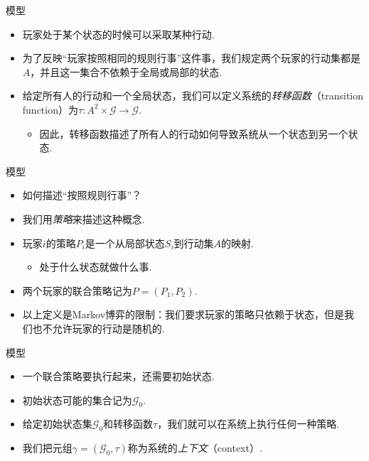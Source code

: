\begin{frame}{模型}
\begin{itemize}
    \item 玩家处于某个状态的时候可以采取某种行动.
    \item 为了反映“玩家按照相同的规则行事”这件事，我们规定两个玩家的行动集都是$A$，并且这一集合不依赖于全局或局部的状态.
    \item 给定所有人的行动和一个全局状态，我们可以定义系统的\emph{转移函数}（transition function）为$\tau:A^2\times\mathcal G\to\mathcal G$.
    \begin{itemize}
        \item 因此，转移函数描述了所有人的行动如何导致系统从一个状态到另一个状态.
    \end{itemize}
\end{itemize}
\end{frame}

\begin{frame}{模型}
\begin{itemize}
    \item 如何描述“按照规则行事”？
    \item 我们用\emph{策略}来描述这种概念.
    \item 玩家$i$的策略$P_i$是一个从局部状态$S_i$到行动集$A$的映射.
    \begin{itemize}
        \item 处于什么状态就做什么事.
    \end{itemize}
    \item 两个玩家的联合策略记为$P=(P_1,P_2)$.
    \item 以上定义是Markov博弈的限制：我们要求玩家的策略只依赖于状态，但是我们也不允许玩家的行动是随机的. 
\end{itemize}
\end{frame}

\begin{frame}{模型}
\begin{itemize}
    \item 一个联合策略要执行起来，还需要初始状态.
    \item 初始状态可能的集合记为$\mathcal G_0$.
    \item 给定初始状态集$\mathcal G_0$和转移函数$\tau$，我们就可以在系统上执行任何一种策略.
    \item 我们把元组$\gamma=(\mathcal G_0,\tau)$称为系统的\emph{上下文}（context）.
\end{itemize}
\end{frame}


